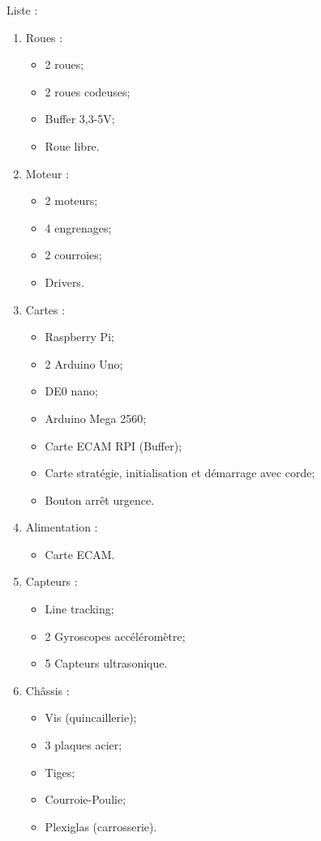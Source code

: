 \noindent Liste : 
\begin{enumerate}
	\item Roues : 
	\begin{itemize}
		\item 2 roues;
		\item 2 roues codeuses;
		\item Buffer 3,3-5V;
		\item Roue libre.
	\end{itemize}

	\item Moteur : 
	\begin{itemize}
		\item 2 moteurs;
		\item 4 engrenages;
		\item 2 courroies;
		\item Drivers.
	\end{itemize}

	\item  Cartes : 
	\begin{itemize}
		\item Raspberry Pi;
		\item 2 Arduino Uno;
		\item DE0 nano;
		\item Arduino Mega 2560;
		\item Carte ECAM RPI (Buffer);
		\item Carte stratégie, initialisation et démarrage avec corde;
		\item Bouton arrêt urgence.
	\end{itemize}

	\item Alimentation : 
	\begin{itemize}
		\item Carte ECAM.
	\end{itemize}

	\item Capteurs : 
	\begin{itemize}
		\item Line tracking;
		\item 2 Gyroscopes accéléromètre;
		\item 5 Capteurs ultrasonique.
	
	\end{itemize}

	\item Châssis : 
	\begin{itemize}
		\item Vis (quincaillerie);
		\item 3 plaques acier;
		\item Tiges;
		\item Courroie-Poulie;
		\item Plexiglas (carrosserie). 
	\end{itemize}


\end{enumerate}
